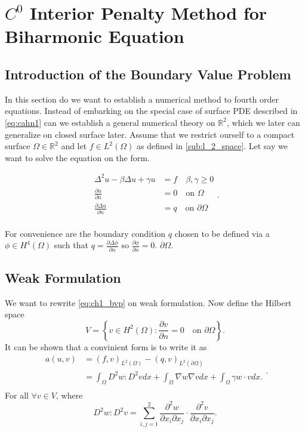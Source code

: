 
\section{$C^0$ Interior Penalty Method for Biharmonic Equation}
\label{sec:ch1}

\subsection{Introduction of the Boundary Value Problem}%
\label{sub:introduction_of_the_bvp}


In this section do we want to establish a numerical method to fourth order equations. Instead of embarking on the
special case of surface PDE described in \eqref{eq:cahn1} can we establish a general numerical theory on $\mathbb{R} ^2$, which we later can generalize on closed surface later. Assume that we restrict ourself to a compact surface $\Omega \in \mathbb{R} ^2 $ and let $f \in L^{2}\left( \Omega
\right) $ as defined in \ref{sub:l_2_space}.
Let say we want to solve the equation on the form.

\begin{equation}
\label{eq:ch1_bvp}
\begin{split}
    \Delta ^2 u - \beta \Delta u + \gamma u &= f \quad \beta , \gamma \ge 0 \\
    \frac{\partial u}{\partial  n}  &= 0 \quad \text{on }\Omega  \\
    \frac{\partial \Delta u}{\partial  n}  &= q \quad \text{on } \partial \Omega  \\
\end{split}
.\end{equation}

For convenience are the boundary condition $q$ chosen to be defined via a  $\phi \in H^{4}\left( \Omega  \right)$
such that $q = \frac{\partial \Delta \phi }{\partial  n} $ so $\frac{\partial \phi }{\partial  n}  = 0$.
$\partial \Omega $.


\subsection{Weak Formulation}%
\label{sub:weak_formulation}

We want to rewrite \eqref{eq:ch1_bvp} on weak formulation. Now define the Hilbert space \[
V = \left\{ v \in H^2\left( \Omega  \right): \frac{\partial v}{\partial  n}  = 0 \quad \text{on } \partial \Omega
\right\}.
\]
It can be shown \cite{gu2012c0} that a convinient form is to write it as
\begin{equation}
\label{eq:weakform}
    \begin{split}
a\left( u,v \right) &=  \left( f,v \right)_{L^2\left( \Omega  \right)}  - \left( q,v \right)_{L^2\left( \partial \Omega  \right)}  \\
& = \int_{\Omega }^{} D^2 w : D^2 v dx +  \int_{\Omega }^{} \nabla w \nabla v dx + \int_{\Omega }^{} \gamma w \cdot v dx
.\\
    \end{split}
.\end{equation}
For all $\forall v \in  V$, where \[
D^2 w : D^2 v = \sum_{i,j=1}^{2}  \frac{\partial ^2 w}{\partial x_{i} \partial x_{j} } \cdot  \frac{\partial ^2 v
}{\partial x_{i} \partial x_{j} }.
\]


